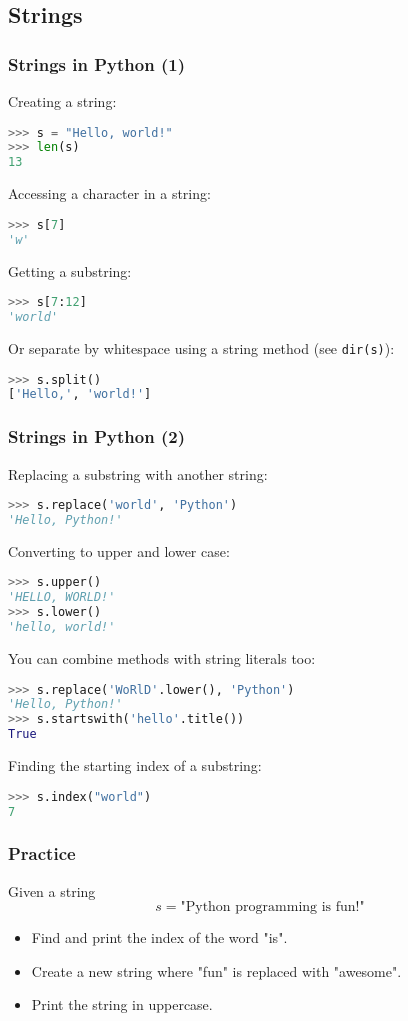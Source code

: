 \subsection{Strings}
\begin{frame}[fragile]
  \frametitle{Strings in Python (1)}
  Creating a string:
  \begin{lstlisting}[language=Python,numbers=none]
>>> s = "Hello, world!"
>>> len(s)
13
  \end{lstlisting}\pause
  Accessing a character in a string:
  \begin{lstlisting}[language=Python,numbers=none]
>>> s[7]
'w'
  \end{lstlisting}\pause
  Getting a substring:
  \begin{lstlisting}[language=Python,numbers=none]
>>> s[7:12]
'world'
  \end{lstlisting}\pause
  Or separate by whitespace using a string method (see \lstinline|dir(s)|):
  \begin{lstlisting}[language=Python,numbers=none]
>>> s.split()
['Hello,', 'world!']
  \end{lstlisting}\pause
\end{frame}

\begin{frame}[fragile]
  \frametitle{Strings in Python (2)}
  Replacing a substring with another string:
  \begin{lstlisting}[language=Python,numbers=none]
>>> s.replace('world', 'Python')
'Hello, Python!'
  \end{lstlisting}\pause
  Converting to upper and lower case:
  \begin{lstlisting}[language=Python,numbers=none]
>>> s.upper()
'HELLO, WORLD!'
>>> s.lower()
'hello, world!'
  \end{lstlisting}\pause
  You can combine methods with string literals too:
  \begin{lstlisting}[language=Python,numbers=none]
>>> s.replace('WoRlD'.lower(), 'Python')
'Hello, Python!'
>>> s.startswith('hello'.title())
True
  \end{lstlisting}
  Finding the starting index of a substring:
  \begin{lstlisting}[language=Python,numbers=none]
>>> s.index("world")
7
  \end{lstlisting}
\end{frame}

\begin{frame}[fragile]
  \frametitle{Practice}
  Given a string
  \[
     s = \text{"Python programming is fun!"}
  \]
  \begin{itemize}
   \item Find and print the index of the word "is".\pause
   \item Create a new string where "fun" is replaced with "awesome".\pause
   \item Print the string in uppercase.
  \end{itemize}
 \end{frame}


